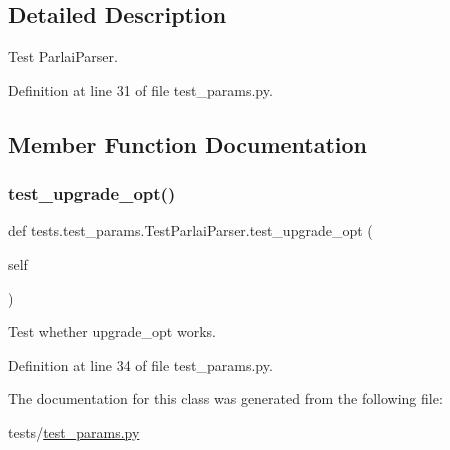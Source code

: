 \subsection{Detailed Description}
\begin{DoxyVerb}Test ParlaiParser.\end{DoxyVerb}
 

Definition at line 31 of file test\+\_\+params.\+py.



\subsection{Member Function Documentation}
\mbox{\label{classtests_1_1test__params_1_1TestParlaiParser_acf8ab1cdd831a5743f56623c0af87d5e}} 
\subsubsection{\texorpdfstring{test\+\_\+upgrade\+\_\+opt()}{test\_upgrade\_opt()}}
{\footnotesize\ttfamily def tests.\+test\+\_\+params.\+Test\+Parlai\+Parser.\+test\+\_\+upgrade\+\_\+opt (\begin{DoxyParamCaption}\item[{}]{self }\end{DoxyParamCaption})}

\begin{DoxyVerb}Test whether upgrade_opt works.\end{DoxyVerb}
 

Definition at line 34 of file test\+\_\+params.\+py.



The documentation for this class was generated from the following file\+:\begin{DoxyCompactItemize}
\item 
tests/\hyperlink{test__params_8py}{test\+\_\+params.\+py}\end{DoxyCompactItemize}

